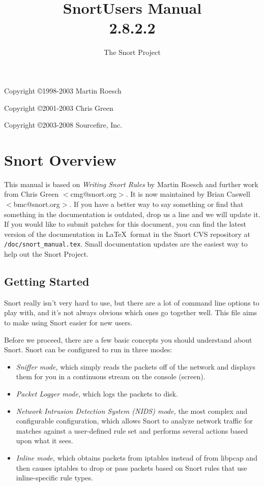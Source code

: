 \documentclass[english]{report}
\begin{document}
\title{Snort\texttrademark  Users Manual\\  2.8.2.2 }

\author{The Snort Project}

\maketitle

\newpage

Copyright \copyright 1998-2003 Martin Roesch

Copyright \copyright 2001-2003 Chris Green

Copyright \copyright 2003-2008 Sourcefire, Inc.

\tableofcontents{}


\chapter{Snort Overview}

This manual is based on \emph{Writing Snort Rules} by Martin Roesch and further
work from Chris Green $<$cmg@snort.org$>$.  It is now maintained by Brian
Caswell $<$bmc@snort.org$>$.  If you have a better way to say something or find
that something in the documentation is outdated, drop us a line and we will
update it.  If you would like to submit patches for this document, you can find
the latest version of the documentation in \LaTeX\ format in the Snort CVS
repository at \verb!/doc/snort_manual.tex!.  Small documentation updates are
the easiest way to help out the Snort Project.

\section{Getting Started}

Snort really isn't very hard to use, but there are a lot of command line
options to play with, and it's not always obvious which ones go together well.
This file aims to make using Snort easier for new users.

Before we proceed, there are a few basic concepts you should understand about
Snort. Snort can be configured to run in three modes:
\begin{itemize}
\item {\em Sniffer mode,} which simply reads the packets off of the network and displays them 
for you in a continuous stream on the console (screen). 
\item {\em Packet Logger mode,} which logs the packets to disk. 
\item {\em Network Intrusion Detection System (NIDS) mode,} the most complex and configurable configuration,
which allows Snort to analyze network traffic for matches against a user-defined
rule set and performs several actions based upon what it sees.
\item {\em Inline mode,} which obtains packets from iptables instead of from libpcap and then
causes iptables to drop or pass packets based on Snort rules that use inline-specific rule types.
\end{itemize}
\end{document}

